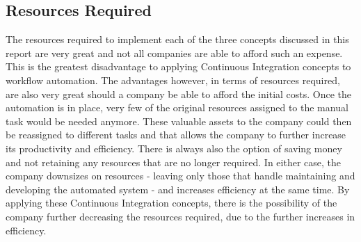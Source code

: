 \subsection{Resources Required} %
\label{sub:resources_required}
The resources required to implement each of the three concepts discussed in this report are very great and not all companies are able to afford such an expense. This is the greatest disadvantage to applying Continuous Integration concepts to workflow automation. The advantages however, in terms of resources required, are also very great should a company be able to afford the initial costs. Once the automation is in place, very few of the original resources assigned to the manual task would be needed anymore. These valuable assets to the company could then be reassigned to different tasks and that allows the company to further increase its productivity and efficiency. There is always also the option of saving money and not retaining any resources that are no longer required. In either case, the company downsizes on resources - leaving only those that handle maintaining and developing the automated system - and increases efficiency at the same time.  By applying these Continuous Integration concepts, there is the possibility of the company further decreasing the resources required, due to the further increases in efficiency.


